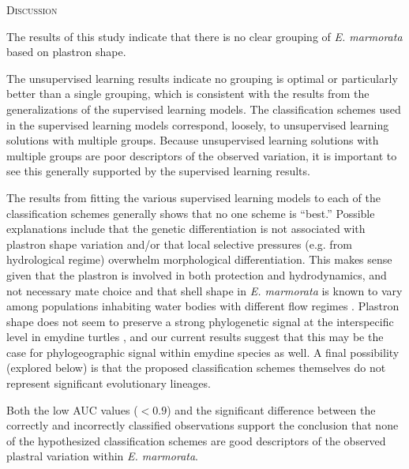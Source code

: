 \documentclass[12pt,letterpaper]{article}
\renewcommand{\section}[1]{%
\bigskip
\begin{center}
\begin{Large}
\normalfont\scshape #1
\medskip
\end{Large}
\end{center}}
\begin{document}
\section{Discussion}

The results of this study indicate that there is no clear grouping of \textit{E. marmorata} based on plastron shape.

The unsupervised learning results indicate no grouping is optimal or particularly better than a single grouping, which is consistent with the results from the generalizations of the supervised learning models. The classification schemes used in the supervised learning models correspond, loosely, to unsupervised learning solutions with multiple groups. Because unsupervised learning solutions with multiple groups are poor descriptors of the observed variation, it is important to see this generally supported by the supervised learning results.

The results from fitting the various supervised learning models to each of the classification schemes generally shows that no one scheme is ``best.'' Possible explanations include that the genetic differentiation is not associated with plastron shape variation and/or that local selective pressures (e.g. from hydrological regime) overwhelm morphological differentiation. This makes sense given that the plastron is involved in both protection and hydrodynamics, and not necessary mate choice \citep{Rivera2008,Rivera2011,Stayton2011,Rivera2014} and that shell shape in \textit{E. marmorata} is known to vary among populations inhabiting water bodies with different flow regimes \citep{Holland1992,Lubcke2007,Germano2009}. Plastron shape does not seem to preserve a strong phylogenetic signal at the interspecific level in emydine turtles \citep{Angielczyk2011}, and our current results suggest that this may be the case for phylogeographic signal within emydine species as well. A final possibility (explored below) is that the proposed classification schemes themselves do not represent significant evolutionary lineages.

Both the low AUC values (\(< 0.9\)) and the significant difference between the correctly and incorrectly classified observations support the conclusion that none of the hypothesized classification schemes are good descriptors of the observed plastral variation within \textit{E. marmorata}.
\end{document}
